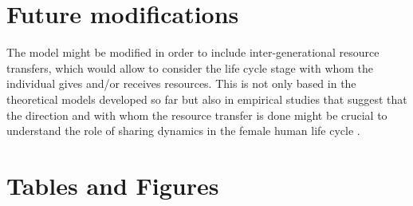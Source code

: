 \documentclass{article}
\begin{document}
\section{Future modifications}

The model might be modified in order to include inter-generational resource transfers, which would allow to consider the life cycle stage with whom the individual gives and/or receives resources. This is not only based in the theoretical models developed so far \citep{lee2003rethinking,chu2006co} but also in empirical studies that suggest that the direction and with whom the resource transfer is done might be crucial to understand the role of sharing dynamics in the female human life cycle \citep{hooper2015inclusive,jones2015resource}.

\section{Tables and Figures}
\end{document}
